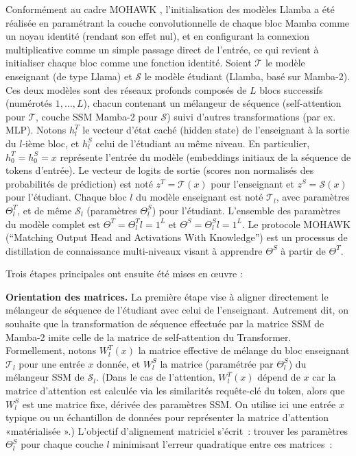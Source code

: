 Conformément au cadre MOHAWK \citep{bick2024transformers}, l’initialisation des modèles Llamba a été réalisée en paramétrant la couche convolutionnelle de chaque bloc Mamba comme un noyau identité (rendant son effet nul), et en configurant la connexion multiplicative comme un simple passage direct de l’entrée, ce qui revient à initialiser chaque bloc comme une fonction identité. Soient $\mathcal{T}$ le modèle enseignant (de type Llama) et $\mathcal{S}$ le modèle étudiant (Llamba, basé sur Mamba-2). Ces deux modèles sont des réseaux profonds composés de $L$ blocs successifs (numérotés $1,\dots,L$), chacun contenant un mélangeur de séquence (self-attention pour $\mathcal{T}$, couche SSM Mamba-2 pour $\mathcal{S}$) suivi d’autres transformations (par ex. MLP). Notons $h^T_l$ le vecteur d’état caché (hidden state) de l’enseignant à la sortie du $l$-ième bloc, et $h^S_l$ celui de l’étudiant au même niveau. En particulier, $h^T_0 = h^S_0 = x$ représente l’entrée du modèle (embeddings initiaux de la séquence de tokens d’entrée). Le vecteur de logits de sortie (scores non normalisés des probabilités de prédiction) est noté $z^T = \mathcal{T}(x)$ pour l’enseignant et $z^S = \mathcal{S}(x)$ pour l’étudiant. Chaque bloc $l$ du modèle enseignant est noté $\mathcal{T}_l$, avec paramètres $\Theta^T_l$, et de même $\mathcal{S}_l$ (paramètres $\Theta^S_l$) pour l’étudiant. L’ensemble des paramètres du modèle complet est $\Theta^T = {\Theta^T_l}{l=1}^L$ et $\Theta^S = {\Theta^S_l}{l=1}^L$. Le protocole MOHAWK (“Matching Output Head and Activations With Knowledge”) est un processus de distillation de connaissance multi-niveaux visant à apprendre $\Theta^S$ à partir de $\Theta^T$.

Trois étapes principales ont ensuite été mises en œuvre :

\newpage

\textbf{Orientation des matrices.} La première étape vise à aligner directement le mélangeur de séquence de l’étudiant avec celui de l’enseignant. Autrement dit, on souhaite que la transformation de séquence effectuée par la matrice SSM de Mamba-2 imite celle de la matrice de self-attention du Transformer. Formellement, notons $W^T_l(x)$ la matrice effective de mélange du bloc enseignant $\mathcal{T}_l$ pour une entrée $x$ donnée, et $W^S_l$ la matrice (paramétrée par $\Theta^S_l$) du mélangeur SSM de $\mathcal{S}_l$. (Dans le cas de l’attention, $W^T_l(x)$ dépend de $x$ car la matrice d’attention est calculée via les similarités requête-clé du token, alors que $W^S_l$ est une matrice fixe, dérivée des paramètres SSM. On utilise ici une entrée $x$ typique ou un échantillon de données pour représenter la matrice d’attention «matérialisée ».) L’objectif d’alignement matriciel s’écrit : trouver les paramètres $\Theta^S_l$ pour chaque couche $l$ minimisant l’erreur quadratique entre ces matrices :

